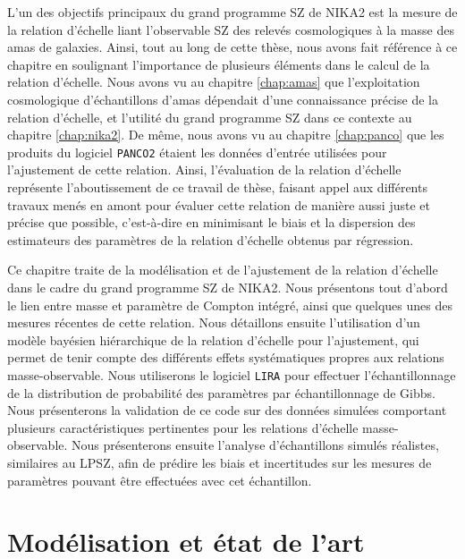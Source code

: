 L'un des objectifs principaux du grand programme SZ de NIKA2 est la mesure de la relation d'échelle liant l'observable SZ des relevés cosmologiques à la masse des amas de galaxies.
Ainsi, tout au long de cette thèse, nous avons fait référence à ce chapitre en soulignant l'importance de plusieurs éléments dans le calcul de la relation d'échelle.
Nous avons vu au chapitre \ref{chap:amas} que l'exploitation cosmologique d'échantillons d'amas dépendait d'une connaissance précise de la relation d'échelle, et l'utilité du grand programme SZ dans ce contexte au chapitre \ref{chap:nika2}.
De même, nous avons vu au chapitre \ref{chap:panco} que les produits du logiciel \texttt{PANCO2} étaient les données d'entrée utilisées pour l'ajustement de cette relation.
Ainsi, l'évaluation de la relation d'échelle représente l'aboutissement de ce travail de thèse, faisant appel aux différents travaux menés en amont pour évaluer cette relation de manière aussi juste et précise que possible, c'est-à-dire en minimisant le biais et la dispersion des estimateurs des paramètres de la relation d'échelle obtenus par régression.

Ce chapitre traite de la modélisation et de l'ajustement de la relation d'échelle dans le cadre du grand programme SZ de NIKA2.
Nous présentons tout d'abord le lien entre masse et paramètre de Compton intégré, ainsi que quelques unes des mesures récentes de cette relation.
Nous détaillons ensuite l'utilisation d'un modèle bayésien hiérarchique de la relation d'échelle pour l'ajustement, qui permet de tenir compte des différents effets systématiques propres aux relations masse-observable.
Nous utiliserons le logiciel \texttt{LIRA} \cite{sereno_bayesian_2016} pour effectuer l'échantillonnage de la distribution de probabilité des paramètres par échantillonnage de Gibbs.
Nous présenterons la validation de ce code sur des données simulées comportant plusieurs caractéristiques pertinentes pour les relations d'échelle masse-observable.
Nous présenterons ensuite l'analyse d'échantillons simulés réalistes, similaires au LPSZ, afin de prédire les biais et incertitudes sur les mesures de paramètres pouvant être effectuées avec cet échantillon.

\section{Modélisation et état de l'art}

